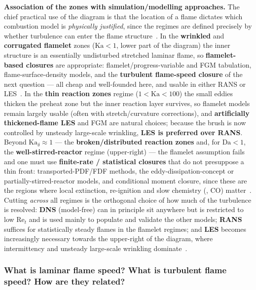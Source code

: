 {\textbf{Association of the zones with simulation/modelling approaches.} The chief practical use of the diagram is that the location of a flame dictates which combustion model is \emph{physically justified}, since the regimes are defined precisely by whether turbulence can enter the flame structure~\cite{lecture10,veynante2002turbulent,peters2000turbulent}. In the \textbf{wrinkled} and \textbf{corrugated flamelet} zones ($\mathrm{Ka}<1$, lower part of the diagram) the inner structure is an essentially undisturbed stretched laminar flame, so \textbf{flamelet-based closures} are appropriate: flamelet/progress-variable and FGM tabulation, flame-surface-density models, and the \textbf{turbulent flame-speed closure} of the next question --- all cheap and well-founded here, and usable in either RANS or LES~\cite{lecture10,vanoijen2000fgm}. In the \textbf{thin reaction zones} regime ($1<\mathrm{Ka}<100$) the small eddies thicken the preheat zone but the inner reaction layer survives, so flamelet models remain largely usable (often with stretch/curvature corrections), and \textbf{artificially thickened-flame LES} and FGM are natural choices; because the brush is now controlled by unsteady large-scale wrinkling, \textbf{LES is preferred over RANS}. Beyond $\mathrm{Ka}_\delta\approx1$ --- the \textbf{broken/distributed reaction zones} and, for $\mathrm{Da}<1$, the \textbf{well-stirred-reactor} regime (upper-right) --- the flamelet assumption fails and one must use \textbf{finite-rate / statistical closures} that do not presuppose a thin front: transported-PDF/FDF methods, the eddy-dissipation-concept or partially-stirred-reactor models, and conditional moment closure, since these are the regions where local extinction, re-ignition and slow chemistry (, CO) matter~\cite{lecture10,veynante2002turbulent}. Cutting \emph{across} all regimes is the orthogonal choice of how much of the turbulence is resolved: \textbf{DNS} (model-free) can in principle sit anywhere but is restricted to low $\mathrm{Re}_t$ and is used mainly to populate and validate the other models; \textbf{RANS} suffices for statistically steady flames in the flamelet regimes; and \textbf{LES} becomes increasingly necessary towards the upper-right of the diagram, where intermittency and unsteady large-scale wrinkling dominate~\cite{lecture10,pope2000turbulent}.
}

\subsubsection{What is laminar flame speed? What is turbulent flame speed? How are they related?}

